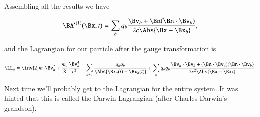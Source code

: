 Assembling all the results we have

\begin{equation}\label{eqn:relativisticElectrodynamicsL25:450}
{\BA'}^{(1)}(\Bx, t) = \sum_b q_b \frac{\Bv_b + \Bn (\Bn \cdot \Bv_b)}{2 c \Abs{\Bx - \Bx_b} },
\end{equation}

and the Lagrangian for our particle after the gauge transformation is

\begin{equation}\label{eqn:relativisticElectrodynamicsL25:330b}
\LL_a = \inv{2} m_a \Bv_a^2 + \frac{m_a}{8} \frac{\Bv_a^4}{c^2} 
-\sum_{b \ne a} \frac{q_a q_b}{\Abs{\Bx_a(t) - \Bx_b(t)}}
+\sum_b q_a q_b \frac{\Bv_a \cdot \Bv_b + (\Bn \cdot \Bv_a) (\Bn \cdot \Bv_b)}{2 c^2 \Abs{\Bx - \Bx_b} }.
\end{equation}

Next time we'll probably get to the Lagrangian for the entire system.  It was hinted that this is called the Darwin Lagrangian (after Charles Darwin's grandson).

\EndArticle
